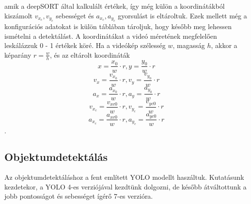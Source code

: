 \documentclass[12pt,a4paper]{article}
\begin{document}
amik a deepSORT által kalkulált értékek, így még külön a koordinátákból kiszámolt \begin{math}v_{x_c},v_{y_c}\end{math} sebességet és
\begin{math}a_{x_c},a_{y_c}\end{math} gyorsulást is eltároltuk.
Ezek mellett még a konfigurációs adatokat is külön táblában tároljuk, hogy később meg lehessen ismételni a detektálást.
A koordinátákat a videó méretének megfelelően leskálázzuk 0 - 1 értékek köré. Ha a videókép szélesség \begin{math}w\end{math}, magasság \begin{math}h\end{math},
akkor a képarány \begin{math}r = \frac{w}{h}\end{math}, és az eltárolt koordináták
\begin{equation}x = \frac{x_0}{w} \cdot r, y = \frac{y_0}{w} \cdot r\end{equation}
\begin{equation}v_x = \frac{v_{x_0}}{w} \cdot r, v_y = \frac{v_{y_0}}{w} \cdot r\end{equation}
\begin{equation}a_x = \frac{a_{x_0}}{w} \cdot r, a_y = \frac{a_{y_0}}{w} \cdot r\end{equation}
\begin{equation}v_{x_c} = \frac{v_{xc0}}{w} \cdot r, v_{y_c} = \frac{v_{yc0}}{w} \cdot r\end{equation}
\begin{equation}a_{x_c} = \frac{a_{xc0}}{w} \cdot r, a_{y_c} = \frac{a_{yc0}}{w} \cdot r\end{equation}.

\subsection{Objektumdetektálás}
Az objektumdetektáláshoz a fent említett YOLO modellt haszáltuk. Kutatásunk kezdetekor, a YOLO 4-es verziójával kezdtünk dolgozni,
de később átváltottunk a jobb pontosságot és sebességet ígérő 7-es verzióra.
\end{document}
